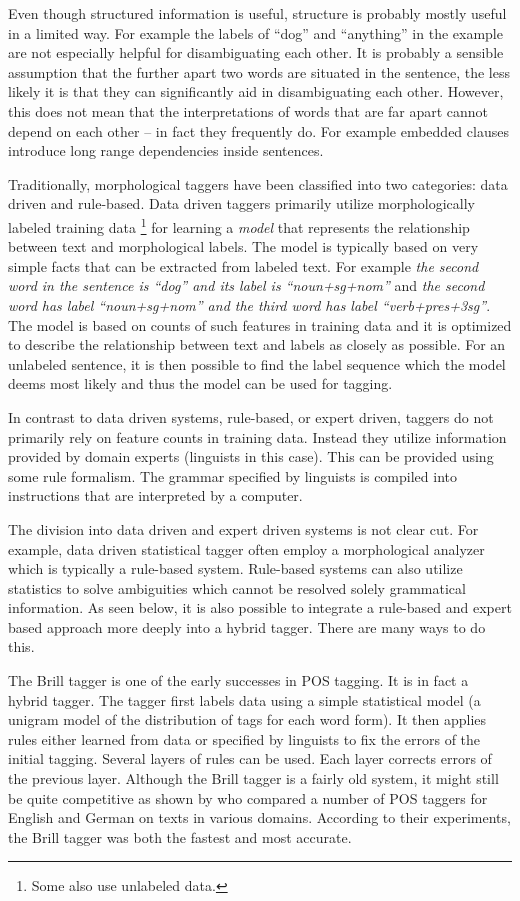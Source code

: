 Even though structured information is useful, structure is probably
mostly useful in a limited way. For example the labels of ``dog'' and
``anything'' in the example are not especially helpful for
disambiguating each other. It is probably a sensible assumption that
the further apart two words are situated in the sentence, the less
likely it is that they can significantly aid in disambiguating each
other. However, this does not mean that the interpretations of words
that are far apart cannot depend on each other -- in fact they
frequently do. For example embedded clauses introduce long range
dependencies inside sentences.

Traditionally, morphological taggers have been classified into two
categories: data driven and rule-based. Data driven taggers primarily
utilize morphologically labeled training data \footnote{Some also use
  unlabeled data.} for learning a {\it model} that represents the
relationship between text and morphological labels. The model is
typically based on very simple facts that can be extracted from
labeled text. For example {\it the second word in the sentence is
  ``dog'' and its label is ``noun+sg+nom''} and {\it the second word
  has label ``noun+sg+nom'' and the third word has label
  ``verb+pres+3sg''}. The model is based on counts of such features in
training data and it is optimized to describe the relationship between
text and labels as closely as possible. For an unlabeled sentence, it
is then possible to find the label sequence which the model deems most
likely and thus the model can be used for tagging.

In contrast to data driven systems, rule-based, or expert driven,
taggers do not primarily rely on feature counts in training
data. Instead they utilize information provided by domain experts
(linguists in this case). This can be provided using some rule
formalism. The grammar specified by linguists is compiled into
instructions that are interpreted by a computer. 

The division into data driven and expert driven systems is not clear
cut. For example, data driven statistical tagger often employ a
morphological analyzer which is typically a rule-based
system. Rule-based systems can also utilize statistics to solve
ambiguities which cannot be resolved solely grammatical
information. As seen below, it is also possible to integrate a
rule-based and expert based approach more deeply into a hybrid
tagger. There are many ways to do this.

The Brill tagger \citep{Brill1992} is one of the early successes in
POS tagging. It is in fact a hybrid tagger. The tagger first labels
data using a simple statistical model (a unigram model of the
distribution of tags for each word form). It then applies rules either
learned from data or specified by linguists to fix the errors of the
initial tagging. Several layers of rules can be used. Each layer
corrects errors of the previous layer. Although the Brill tagger is a
fairly old system, it might still be quite competitive as shown by
\cite{Horsmann2015} who compared a number of POS taggers for English
and German on texts in various domains. According to their
experiments, the Brill tagger was both the fastest and most accurate.

